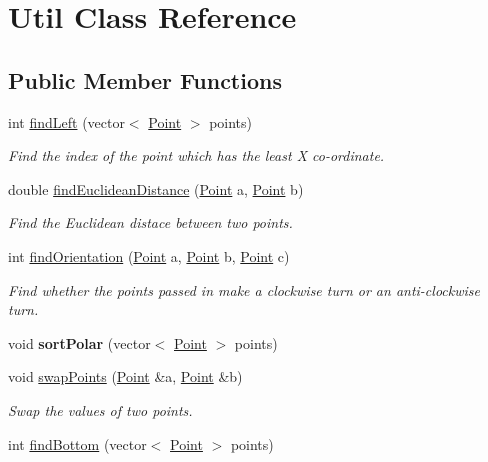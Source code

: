 \hypertarget{classUtil}{}\section{Util Class Reference}
\label{classUtil}
\subsection*{Public Member Functions}
\begin{DoxyCompactItemize}
\item 
int \hyperlink{classUtil_a2b30e2030f853420c6fdc322b9c0baf0}{find\+Left} (vector$<$ \hyperlink{classPoint}{Point} $>$ points)
\begin{DoxyCompactList}\small\item\em Find the index of the point which has the least X co-\/ordinate. \end{DoxyCompactList}\item 
double \hyperlink{classUtil_aee5381da3131d816c37c440fea97c84e}{find\+Euclidean\+Distance} (\hyperlink{classPoint}{Point} a, \hyperlink{classPoint}{Point} b)
\begin{DoxyCompactList}\small\item\em Find the Euclidean distace between two points. \end{DoxyCompactList}\item 
int \hyperlink{classUtil_aebf1ad2a9ca5faeaca744d4464182170}{find\+Orientation} (\hyperlink{classPoint}{Point} a, \hyperlink{classPoint}{Point} b, \hyperlink{classPoint}{Point} c)
\begin{DoxyCompactList}\small\item\em Find whether the points passed in make a clockwise turn or an anti-\/clockwise turn. \end{DoxyCompactList}\item 
\mbox{\label{classUtil_aec45879e4089e120607474b34e759a18}} 
void {\bfseries sort\+Polar} (vector$<$ \hyperlink{classPoint}{Point} $>$ points)
\item 
void \hyperlink{classUtil_a40ff824653381aaceaa05e60a5300cc1}{swap\+Points} (\hyperlink{classPoint}{Point} \&a, \hyperlink{classPoint}{Point} \&b)
\begin{DoxyCompactList}\small\item\em Swap the values of two points. \end{DoxyCompactList}\item 
int \hyperlink{classUtil_a2aa1aedf21bb79a5cc6c13f138735834}{find\+Bottom} (vector$<$ \hyperlink{classPoint}{Point} $>$ points)

\end{DoxyCompactItemize}
